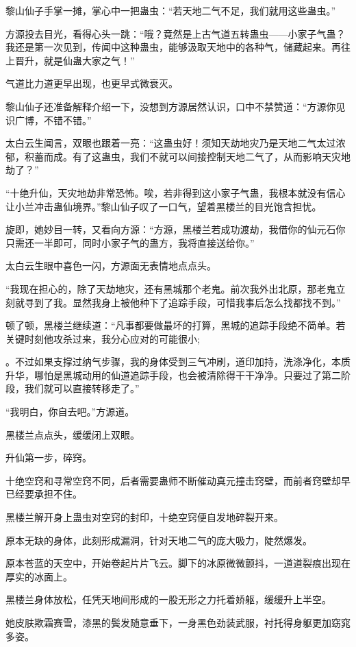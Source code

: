 \begin{this_body}
黎山仙子手掌一摊，掌心中一把蛊虫：“若天地二气不足，我们就用这些蛊虫。”

方源投去目光，看得心头一跳：“哦？竟然是上古气道五转蛊虫——小家子气蛊？我还是第一次见到，传闻中这种蛊虫，能够汲取天地中的各种气，储藏起来。再往上晋升，就是仙蛊大家之气！”

气道比力道更早出现，也更早式微衰灭。

黎山仙子还准备解释介绍一下，没想到方源居然认识，口中不禁赞道：“方源你见识广博，不错不错。”

太白云生闻言，双眼也跟着一亮：“这蛊虫好！须知天劫地灾乃是天地二气太过浓郁，积蓄而成。有了这蛊虫，我们不就可以间接控制天地二气了，从而影响天灾地劫了？”

“十绝升仙，天灾地劫非常恐怖。唉，若非得到这小家子气蛊，我根本就没有信心让小兰冲击蛊仙境界。”黎山仙子叹了一口气，望着黑楼兰的目光饱含担忧。

旋即，她妙目一转，又看向方源：“方源，黑楼兰若成功渡劫，我借你的仙元石你只需还一半即可，同时小家子气的蛊方，我将直接送给你。”

太白云生眼中喜色一闪，方源面无表情地点点头。

“我现在担心的，除了天劫地灾，还有黑城那个老鬼。前次我外出北原，那老鬼立刻就寻到了我。显然我身上被他种下了追踪手段，可惜我事后怎么找都找不到。”

顿了顿，黑楼兰继续道：“凡事都要做最坏的打算，黑城的追踪手段绝不简单。若关键时刻他攻杀过来，我分心应对的可能很小;

。不过如果支撑过纳气步骤，我的身体受到三气冲刷，道印加持，洗涤净化，本质升华，哪怕是黑城动用的仙道追踪手段，也会被清除得干干净净。只要过了第二阶段，我们就可以直接转移走了。”

“我明白，你自去吧。”方源道。

黑楼兰点点头，缓缓闭上双眼。

升仙第一步，碎窍。

十绝空窍和寻常空窍不同，后者需要蛊师不断催动真元撞击窍壁，而前者窍壁却早已经要承担不住。

黑楼兰解开身上蛊虫对空窍的封印，十绝空窍便自发地碎裂开来。

原本无缺的身体，此刻形成漏洞，针对天地二气的庞大吸力，陡然爆发。

原本苍蓝的天空中，开始卷起片片飞云。脚下的冰原微微颤抖，一道道裂痕出现在厚实的冰面上。

黑楼兰身体放松，任凭天地间形成的一股无形之力托着娇躯，缓缓升上半空。

她皮肤欺霜赛雪，漆黑的鬓发随意垂下，一身黑色劲装武服，衬托得身躯更加窈窕多姿。


\end{this_body}

